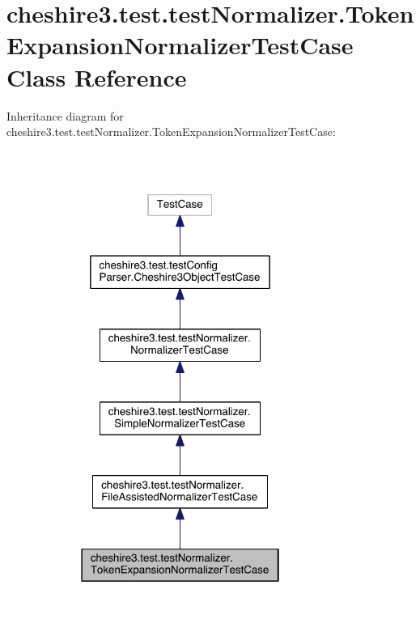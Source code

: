 \hypertarget{classcheshire3_1_1test_1_1test_normalizer_1_1_token_expansion_normalizer_test_case}{\section{cheshire3.\-test.\-test\-Normalizer.\-Token\-Expansion\-Normalizer\-Test\-Case Class Reference}
\label{classcheshire3_1_1test_1_1test_normalizer_1_1_token_expansion_normalizer_test_case}
}


Inheritance diagram for cheshire3.\-test.\-test\-Normalizer.\-Token\-Expansion\-Normalizer\-Test\-Case\-:
\nopagebreak
\begin{figure}[H]
\begin{center}
\leavevmode
\includegraphics[width=262pt]{classcheshire3_1_1test_1_1test_normalizer_1_1_token_expansion_normalizer_test_case__inherit__graph}
\end{center}
\end{figure}


